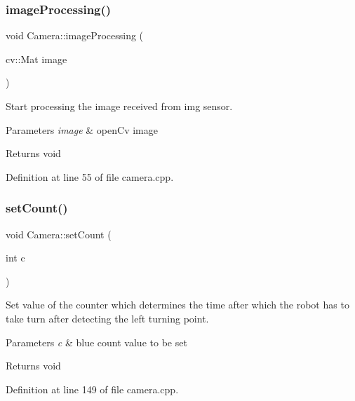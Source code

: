 \subsubsection{\texorpdfstring{image\+Processing()}{imageProcessing()}}
{\footnotesize\ttfamily void Camera\+::image\+Processing (\begin{DoxyParamCaption}\item[{cv\+::\+Mat}]{image }\end{DoxyParamCaption})}



Start processing the image received from img sensor. 


\begin{DoxyParams}{Parameters}
{\em image} & open\+Cv image \\
\hline
\end{DoxyParams}
\begin{DoxyReturn}{Returns}
void 
\end{DoxyReturn}


Definition at line 55 of file camera.\+cpp.

\mbox{\label{class_camera_a3186b8e7cf648308237a2ba440379e34}} 
\subsubsection{\texorpdfstring{set\+Count()}{setCount()}}
{\footnotesize\ttfamily void Camera\+::set\+Count (\begin{DoxyParamCaption}\item[{int}]{c }\end{DoxyParamCaption})}



Set value of the counter which determines the time after which the robot has to take turn after detecting the left turning point. 


\begin{DoxyParams}{Parameters}
{\em c} & blue count value to be set \\
\hline
\end{DoxyParams}
\begin{DoxyReturn}{Returns}
void 
\end{DoxyReturn}


Definition at line 149 of file camera.\+cpp.

\mbox{\label{class_camera_a66d6f05a42feb58468bc4039b07b1b23}} 

